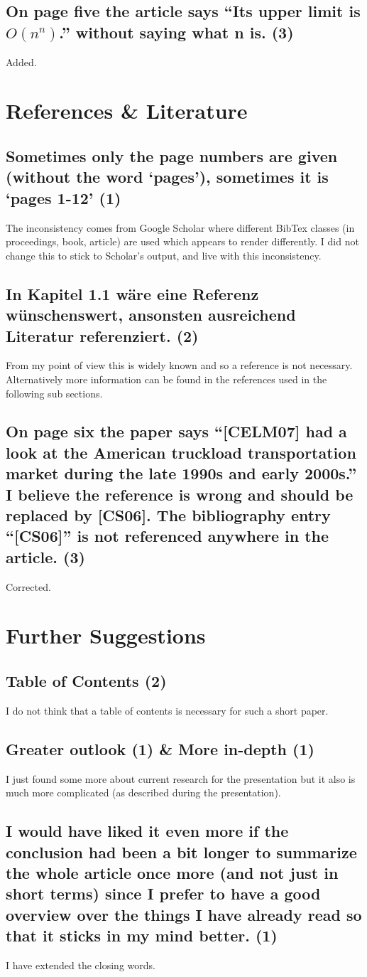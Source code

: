 \documentclass{"../../Datenanalyse/assignments/latex-brookesassignment/brookes-assignment"}
\begin{document}
\subsection{On page five the article says ``Its upper limit is $O(n^n)$.'' without saying what n is. (3)}
Added.

\section{References \& Literature}
\subsection{Sometimes only the page numbers are given (without the word `pages'), sometimes it is `pages 1-12' (1)}
The inconsistency comes from Google Scholar where different BibTex classes (in proceedings, book, article) are used which appears to render differently. I did not change this to stick to Scholar's output, and live with this inconsistency.
\subsection{In Kapitel 1.1 wäre eine Referenz wünschenswert, ansonsten ausreichend Literatur referenziert. (2)}
From my point of view this is widely known and so a reference is not necessary. Alternatively more information can be found in the references used in the following sub sections.
\subsection{On page six the paper says ``[CELM07] had a look at the American truckload transportation market during the late 1990s and early 2000s.'' I believe the reference is wrong and should be replaced by [CS06]. The bibliography entry ``[CS06]'' is not referenced anywhere in the article. (3)}
Corrected.

\section{Further Suggestions}
\subsection{Table of Contents (2)}
I do not think that a table of contents is necessary for such a short paper.
\subsection{Greater outlook (1) \& More in-depth (1)}
I just found some more about current research for the presentation but it also is much more complicated (as described during the presentation).
\subsection{I would have liked it even more if the conclusion had been a bit longer to summarize the whole article once more (and not just in short terms) since I prefer to have a good overview over the things I have already read so that it sticks in my mind better. (1)}
I have extended the closing words.
\end{document}
